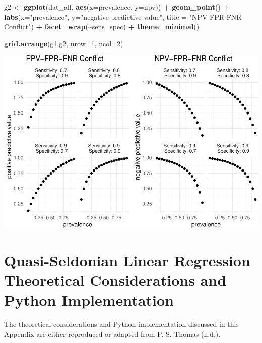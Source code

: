 \documentclass[12pt, twoside]{amherstthesis}
\newenvironment{Shaded}{\begin{snugshade}}{\end{snugshade}}
\newcommand{\AttributeTok}[1]{\textcolor[rgb]{0.13,0.29,0.53}{#1}}
\newcommand{\DecValTok}[1]{\textcolor[rgb]{0.00,0.00,0.81}{#1}}
\newcommand{\FunctionTok}[1]{\textcolor[rgb]{0.13,0.29,0.53}{\textbf{#1}}}
\newcommand{\NormalTok}[1]{#1}
\newcommand{\OtherTok}[1]{\textcolor[rgb]{0.56,0.35,0.01}{#1}}
\newcommand{\SpecialCharTok}[1]{\textcolor[rgb]{0.81,0.36,0.00}{\textbf{#1}}}
\newcommand{\StringTok}[1]{\textcolor[rgb]{0.31,0.60,0.02}{#1}}
\begin{document}
\begin{Shaded}
\begin{Highlighting}[]
\NormalTok{g2 }\OtherTok{\textless{}{-}} \FunctionTok{ggplot}\NormalTok{(dat\_all, }\FunctionTok{aes}\NormalTok{(}\AttributeTok{x=}\NormalTok{prevalence, }\AttributeTok{y=}\NormalTok{npv)) }\SpecialCharTok{+}
        \FunctionTok{geom\_point}\NormalTok{() }\SpecialCharTok{+} 
        \FunctionTok{labs}\NormalTok{(}\AttributeTok{x=}\StringTok{"prevalence"}\NormalTok{, }\AttributeTok{y=}\StringTok{"negative predictive value"}\NormalTok{,}
             \AttributeTok{title =} \StringTok{"NPV{-}FPR{-}FNR Conflict"}\NormalTok{) }\SpecialCharTok{+}
        \FunctionTok{facet\_wrap}\NormalTok{(}\SpecialCharTok{\textasciitilde{}}\NormalTok{sens\_spec) }\SpecialCharTok{+}
  \FunctionTok{theme\_minimal}\NormalTok{()}

\FunctionTok{grid.arrange}\NormalTok{(g1,g2, }\AttributeTok{nrow=}\DecValTok{1}\NormalTok{, }\AttributeTok{ncol=}\DecValTok{2}\NormalTok{)}
\end{Highlighting}
\end{Shaded}
\begin{center}\includegraphics{Dasha-Asienga_StatThesis_files/figure-latex/unnamed-chunk-51-1} \end{center}

\hypertarget{appendix-b}{%
\chapter{Quasi-Seldonian Linear Regression Theoretical Considerations and Python Implementation}\label{appendix-b}}

The theoretical considerations and Python implementation discussed in this Appendix are either reproduced or adapted from P. S. Thomas (n.d.).
\end{document}
